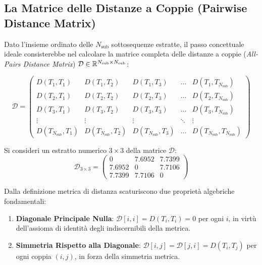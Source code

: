 \FloatBarrier
\subsection{La Matrice delle Distanze a Coppie (Pairwise Distance Matrix)}
\label{subsec:ts-pairwise-matrix}

Dato l'insieme ordinato delle $N_{\text{sub}}$ sottosequenze estratte, il passo concettuale ideale consisterebbe nel calcolare la matrice completa delle distanze a coppie (\textit{All-Pairs Distance Matrix}) $\mathcal{D} \in \mathbb{R}^{N_{\text{sub}} \times N_{\text{sub}}}$:

\begin{equation}
\label{eq:pairwise-dist-matrix}
\mathcal{D} = 
\begin{pmatrix}
D(T_1, T_1) & D(T_1, T_2) & D(T_1, T_3) & \dots & D(T_1, T_{N_{\text{sub}}}) \\
D(T_2, T_1) & D(T_2, T_2) & D(T_2, T_3) & \dots & D(T_2, T_{N_{\text{sub}}}) \\
D(T_3, T_1) & D(T_3, T_2) & D(T_3, T_3) & \dots & D(T_3, T_{N_{\text{sub}}}) \\
\vdots & \vdots & \vdots & \ddots & \vdots \\
D(T_{N_{\text{sub}}}, T_1) & D(T_{N_{\text{sub}}}, T_2) & D(T_{N_{\text{sub}}}, T_3) & \dots & D(T_{N_{\text{sub}}}, T_{N_{\text{sub}}})
\end{pmatrix}
\end{equation}

Si consideri un estratto numerico $3 \times 3$ della matrice $\mathcal{D}$:
\begin{equation}
\mathcal{D}_{3 \times 3} = 
\begin{pmatrix}
0 & 7.6952 & 7.7399 \\
7.6952 & 0 & 7.7106 \\
7.7399 & 7.7106 & 0
\end{pmatrix}
\end{equation}

Dalla definizione metrica di distanza scaturiscono due propriet\`a algebriche fondamentali:
\begin{enumerate}
    \item \textbf{Diagonale Principale Nulla}: $\mathcal{D}[i, i] = D(T_i, T_i) = 0$ per ogni $i$, in virt\`u dell'assioma di identit\`a degli indiscernibili della metrica.
    \item \textbf{Simmetria Rispetto alla Diagonale}: $\mathcal{D}[i, j] = \mathcal{D}[j, i] = D(T_i, T_j)$ per ogni coppia $(i, j)$, in forza della simmetria metrica.
\end{enumerate}

